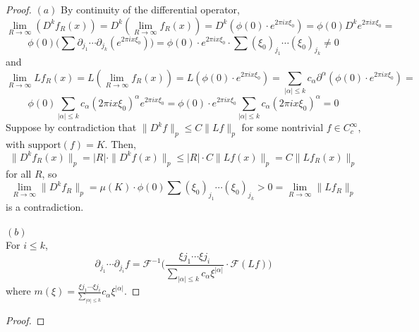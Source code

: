 \documentclass[12pt]{article}
\newenvironment{exercise}[2][Exercise]{\begin{trivlist}
\item[\hskip \labelsep {\bfseries #1}\hskip \labelsep {\bfseries #2.}]}{\end{trivlist}}
\begin{document}
\begin{exercise}{2}
\end{exercise}

\begin{proof}
  $(a)$ By continuity of the differential operator,
  $$
    \lim_{R \rightarrow \infty} (D^k f_R(x)) =
    D^k(\lim_{R \rightarrow \infty} f_R(x)) =
    D^k(\phi(0) \cdot e^{2 \pi i x \xi_0}) =
    \phi(0)  D^k e^{2 \pi i x \xi_0} =
  $$
  $$
    \phi(0) \Big( \sum \partial_{j_1} \cdots \partial_{j_k}(e^{2 \pi i x \xi_0}) \Big) =
    \phi(0) \cdot e^{2 \pi i x \xi_0}  \cdot \sum (\xi_0)_{j_1} \cdots (\xi_0)_{j_k} \ne 0
  $$
  and
  $$
    \lim_{R \rightarrow \infty} L f_R(x) =
    L(\lim_{R \rightarrow \infty} f_R(x)) =
    L(\phi(0) \cdot e^{2 \pi i x \xi_0}) =
    \sum_{|\alpha| \le k}  c_\alpha \partial^\alpha (\phi(0) \cdot e^{2 \pi i x \xi_0}) =
  $$
  $$
    \phi(0) \sum_{|\alpha| \le k}  c_\alpha (2 \pi i x \xi_0)^\alpha e^{2 \pi i x \xi_0}  =
    \phi(0) \cdot e^{2 \pi i x \xi_0} \sum_{|\alpha| \le k}  c_\alpha (2 \pi i x \xi_0)^\alpha =
    0
  $$
  Suppose by contradiction that $\|D^k f\|_p \le C  \|Lf\|_p$ for some nontrivial $f \in C^\infty_c$, with $\text{support}(f) = K$. Then,
  $$
    \|D^k f_R(x)\|_p =
    |R| \cdot \|D^k f(x)\|_p \le
    |R| \cdot C \|Lf(x)\|_p =
    C \|Lf_R(x)\|_p
  $$
  for all $R$, so
  $$
    \lim_{R \rightarrow \infty} \|D^k f_R\|_p =
    \mu(K) \cdot \phi(0) \sum (\xi_0)_{j_1} \cdots (\xi_0)_{j_k} >
    0 =
    \lim_{R \rightarrow \infty} \|Lf_R\|_p
  $$
  is a contradiction.\\\\
  $(b)$\\
  For  $i \le k$,
  $$
    \partial_{j_1} \cdots \partial_{j_i} f =
    \mathcal{F}^{-1}\Big( \dfrac{\xi{j_1} \cdots \xi{j_i}}{\sum_{|\alpha| \le k} c_\alpha \xi^{|\alpha|}} \cdot \mathcal{F}(Lf) \Big)
  $$
  where $m(\xi) = \frac{\xi{j_1} \cdots \xi{j_i}}{\sum_{|\alpha| \le k}} c_\alpha \xi^{|\alpha|}$.
\end{proof}

\begin{exercise}{3}
\end{exercise}

\begin{proof}

\end{proof}
\end{document}
